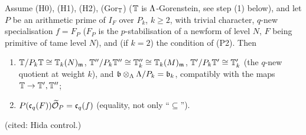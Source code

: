 \begin{lemma}\label{lem:s06-control}
Assume (H0), (H1), (H2), (Gor$_{\mathbb{T}}$) ($\mathbb{T}$ is $\Lambda$-Gorenstein, see step (1) below), and let $P$ be an arithmetic prime of $I_F$
over $P_k$, $k\ge2$, with trivial character, $q$-new specialisation $f=F_P$ ($F_P$ is the $p$-stabilisation of a newform of level $N$, $F$ being primitive of tame level $N$), and (if $k=2$) the condition of (P2). Then
\begin{enumerate}[label=(\alph*)]
\item $\mathbb{T}/P_k\mathbb{T}\cong\mathbb{T}_k(N)_{\mathfrak{m}}$, $\mathbb{T}''/P_k\mathbb{T}''\cong\mathbb{T}''_k\cong\mathbb{T}_k(M)_{\mathfrak{m}}$, $\mathbb{T}'/P_k\mathbb{T}'\cong\mathbb{T}'_k$ (the $q$-new quotient at weight $k$), and
  $\mathfrak{b}\otimes_\Lambda\Lambda/P_k=\mathfrak{b}_k$, compatibly with the maps $\mathbb{T}\to\mathbb{T}',\mathbb{T}''$;
\item $P(\mathfrak{c}_q(F))\widetilde{\mathcal{O}}_P=\mathfrak{c}_q(f)$ (equality, not only ``$\subseteq$'').
\end{enumerate}
\stpmc{} (cited: Hida control.)
\end{lemma}
